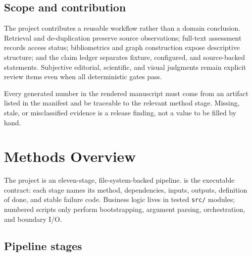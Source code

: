 \documentclass[
]{article}
\begin{document}
\subsection{Scope and contribution}\label{scope-and-contribution}

The project contributes a reusable workflow rather than a domain
conclusion. Retrieval and de-duplication preserve source observations;
full-text assessment records access status; bibliometrics and graph
construction expose descriptive structure; and the claim ledger
separates fixture, configured, and source-backed statements. Subjective
editorial, scientific, and visual judgments remain explicit review items
even when all deterministic gates pass.

Every generated number in the rendered manuscript must come from an
artifact listed in the manifest and be traceable to the relevant method
stage. Missing, stale, or misclassified evidence is a release finding,
not a value to be filled by hand.

\newpage

\section{Methods Overview}\label{methods-overview}

The project is an eleven-stage, file-system-backed pipeline.
 is the executable contract: each stage
names its method, dependencies, inputs, outputs, definition of done, and
stable failure code. Business logic lives in tested \texttt{src/}
modules; numbered scripts only perform bootstrapping, argument parsing,
orchestration, and boundary I/O.

\subsection{Pipeline stages}\label{pipeline-stages}
\end{document}
